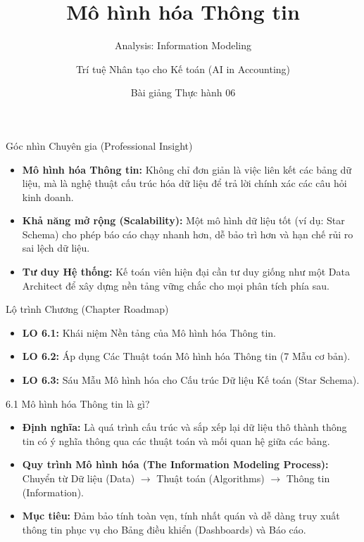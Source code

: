 \documentclass[aspectratio=169,12pt]{beamer}
\title[Thực hành - Chương 06]{Mô hình hóa Thông tin}
\subtitle{Analysis: Information Modeling}
\author[Giảng viên]{Trí tuệ Nhân tạo cho Kế toán (AI in Accounting)}
\institute[Đại học]{Khoa Kế toán - Kiểm toán}
\date{Bài giảng Thực hành 06}
\begin{document}
\begin{frame}
    \titlepage
\end{frame}

\begin{frame}{Góc nhìn Chuyên gia (Professional Insight)}
\begin{itemize}
    \item \textbf{Mô hình hóa Thông tin:} Không chỉ đơn giản là việc liên kết các bảng dữ liệu, mà là nghệ thuật cấu trúc hóa dữ liệu để trả lời chính xác các câu hỏi kinh doanh.
    \item \textbf{Khả năng mở rộng (Scalability):} Một mô hình dữ liệu tốt (ví dụ: Star Schema) cho phép báo cáo chạy nhanh hơn, dễ bảo trì hơn và hạn chế rủi ro sai lệch dữ liệu.
    \item \textbf{Tư duy Hệ thống:} Kế toán viên hiện đại cần tư duy giống như một Data Architect để xây dựng nền tảng vững chắc cho mọi phân tích phía sau.
\end{itemize}
\end{frame}

\begin{frame}{Lộ trình Chương (Chapter Roadmap)}
\begin{itemize}
    \item \textbf{LO 6.1:} Khái niệm Nền tảng của Mô hình hóa Thông tin.
    \item \textbf{LO 6.2:} Áp dụng Các Thuật toán Mô hình hóa Thông tin (7 Mẫu cơ bản).
    \item \textbf{LO 6.3:} Sáu Mẫu Mô hình hóa cho Cấu trúc Dữ liệu Kế toán (Star Schema).
\end{itemize}
\end{frame}

\begin{frame}{6.1 Mô hình hóa Thông tin là gì?}
\begin{itemize}
    \item \textbf{Định nghĩa:} Là quá trình cấu trúc và sắp xếp lại dữ liệu thô thành thông tin có ý nghĩa thông qua các thuật toán và mối quan hệ giữa các bảng.
    \item \textbf{Quy trình Mô hình hóa (The Information Modeling Process):} Chuyển từ Dữ liệu (Data) $\rightarrow$ Thuật toán (Algorithms) $\rightarrow$ Thông tin (Information).
    \item \textbf{Mục tiêu:} Đảm bảo tính toàn vẹn, tính nhất quán và dễ dàng truy xuất thông tin phục vụ cho Bảng điều khiển (Dashboards) và Báo cáo.
\end{itemize}
\end{frame}
\end{document}
